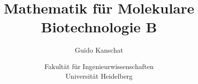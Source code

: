 \usepackage[utf8]{inputenc}
\usepackage[german]{babel}
\usepackage{url}
\usepackage{nicefrac}
\usepackage{graphicx}
\usepackage{tikz,tikzscale}
\usepackage{pgfplots}
\pgfplotsset{compat=1.18}
\usetikzlibrary{arrows.meta,calc}
\usepackage{amsthm}
\usepackage{float}
\usepackage{environ}
\usepackage{listings}
\lstset{language=Matlab}
\usepackage{customdice}

\title{Mathematik für Molekulare Biotechnologie B}
\author{Guido Kanschat}
\date{Fakultät für Ingenieurwissenschaften\\Universität Heidelberg}

\usepackage[mode=multiuser]{fixme}

\theoremstyle{remark}
\newenvironment{Aufgabe}{\begin{onlyenv}<article>\subsubsection{Aufgabe}}{\end{onlyenv}}
\newenvironment{Wdh}{\begin{onlyenv}<article>\textbf{Wiederholung: }}%
{\end{onlyenv}}
\newenvironment{Vertiefung}{\begin{onlyenv}<article>\textbf{Vertiefung: }}%
{\end{onlyenv}}
\newenvironment{Denkpause}{%
  \begin{onlyenv}<presentation>%
    \begin{exampleblock}{Denkpause}%
}{%
    \end{exampleblock}%
  \end{onlyenv}%
}


\let\epsilon\varepsilon
\let\phi\varphi
\let\theta\vartheta
\def\ii{\mathrm i}
\def\ds{\,ds}
\def\dt{\,dt}
\def\vecsym#1{\mathbf{#1}}
\def\vx{\vecsym x}
\def\vy{\vecsym y}
\def\vb{\vecsym b}
\def\vd{\vecsym d}
\def\ve{\vecsym e}
\def\vf{\vecsym f}
\def\vF{\vecsym F}
\def\vF{\vecsym F}
\def\vg{\vecsym g}
\def\vk{\vecsym k}
\def\vS{\vecsym S}
\def\vT{\vecsym T}
\def\vu{\vecsym u}
\def\vv{\vecsym v}
\def\vw{\vecsym w}
\def\R{\mathbb R}
\def\Rnn{\R^{n\times n}}

\def\norm#1{\left\|#1\right\|}
\def\scal(#1,#2){\left<#1,#2\right>}

\def\ereignisraum{\mathcal F}
